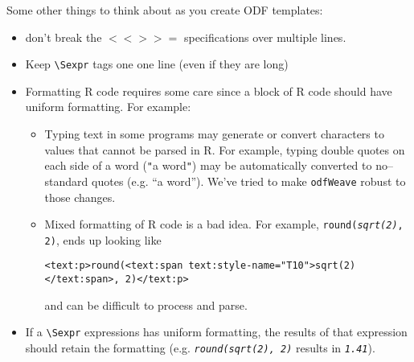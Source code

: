 \documentclass[12pt]{article}
\newcommand{\odfWeaveFunc}{{\tt odfWeave}\xspace}
\begin{document}
Some other things to think about as you create ODF templates:
\begin{itemize}
\item don't break the $<<>>=$ specifications over multiple lines. 
\item Keep \verb+\Sexpr+ tags one one line (even if they are long)
\item Formatting R code requires some care since a block of R code should have uniform formatting. For example:
   \begin{itemize}
      \item  Typing text in some programs may generate or convert characters to values that cannot be parsed in R. For example, typing double quotes on each side of a word (\verb+"+a word\verb+"+) may be automatically converted to no--standard quotes (e.g. ``a word''). We've tried to make \odfWeaveFunc robust to those changes. 
      \item Mixed formatting of R code is a bad idea. For example,  \texttt{round({\it sqrt(2)}, 2)}, ends up looking like
      
      {\center \small \verb+<text:p>round(<text:span text:style-name="T10">sqrt(2)</text:span>, 2)</text:p>+}
      
      and can be difficult to process and parse.
   \end{itemize}
   \item If a \verb+\Sexpr+ expressions has uniform formatting, the results of that expression should retain the formatting (e.g. {\it \texttt{round(sqrt(2), 2)}} results in {\it \texttt{1.41}}).

\end{itemize}
	
	

%
%
%
%	
	
\end{document}

